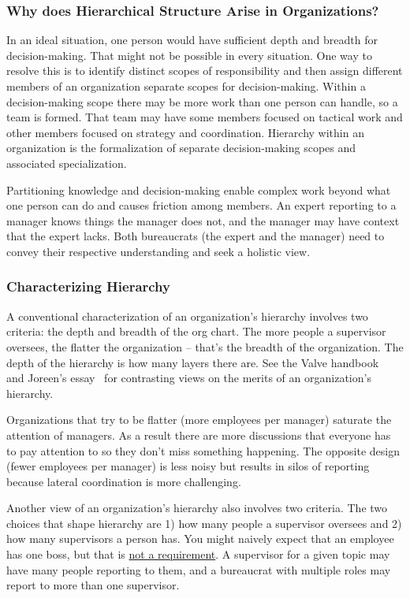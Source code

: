 \subsubsection*{Why does Hierarchical Structure Arise in Organizations?}

In an ideal situation, one person would have sufficient depth and breadth for decision-making. That might not be possible in every situation. One way to resolve this is to identify distinct scopes of responsibility and then assign different members of an organization separate scopes for decision-making. Within a decision-making scope there may be more work than one person can handle, so a team is formed. That team may have some members focused on tactical work and other members focused on strategy and coordination. Hierarchy within an organization is the formalization of separate decision-making scopes and associated specialization. 

Partitioning knowledge and decision-making enable complex work beyond what one person can do and causes friction among members. An expert reporting to a manager knows things the manager does not, and the manager may have context that the expert lacks. Both bureaucrats (the expert and the manager) need to convey their respective understanding and seek a holistic view.

\subsubsection*{Characterizing Hierarchy}

A conventional characterization of an organization's hierarchy involves two criteria: the depth and breadth of the \gls{org chart}.
The more people a supervisor oversees, the flatter the organization -- that's the breadth of the organization. The depth of the hierarchy is how many layers there are. See the Valve handbook~\cite{2012_Valve} and Joreen's essay~\cite{1972_Joreen} for contrasting views on the merits of an organization's hierarchy. 

Organizations that try to be flatter (more employees per manager) saturate the attention of managers. As a result there are more discussions that everyone has to pay attention to so they don't miss something happening. The opposite design (fewer employees per manager) is less noisy but results in silos of reporting because lateral coordination is more challenging.

Another view of an organization's hierarchy also involves two criteria. The two choices that shape hierarchy are 
1) how many people a supervisor oversees and 
2) how many supervisors a person has. 
You might naively expect that an employee has one boss, but that is \href{https://en.wikipedia.org/wiki/Matrix_management}{not a requirement}. 
\iftoggle{WPinmargin}{\marginpar{$>$Wikipedia: Matrix management}}{}
A supervisor for a given topic may have many people reporting to them, and a bureaucrat with multiple roles may report to more than one supervisor.


